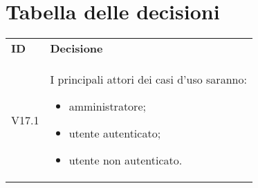 \documentclass[]{article}
\begin{document}
	\newpage

	\section{Tabella delle decisioni}
	
	\begin{table} [h!]
		\begin{center}
			\begin{tabular} { m{2cm} m{14cm} }
				\rowcolor{lightgray}
				\textbf{ID} & \textbf{Decisione}\\
				V17.1 & I principali attori dei casi d'uso saranno:
				\begin{itemize}
					\item amministratore;
					\item utente autenticato;
					\item utente non autenticato.
				\end{itemize}
			\end{tabular}
		\end{center}
	\end{table}	
\end{document}
